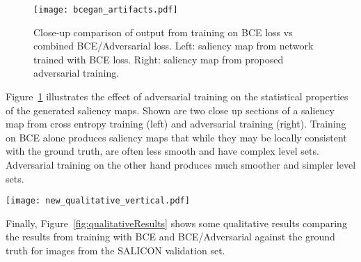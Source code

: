 \documentclass[times,twocolumn,final,authoryear]{elsarticle}
\begin{document}
\begin{figure}
\centering
\texttt{[image: bcegan\_artifacts.pdf]}
\caption{Close-up comparison of output from training on BCE loss vs combined BCE/Adversarial loss. Left: saliency map from network trained with BCE loss. Right: saliency map from proposed adversarial training.}
\label{fig:bcsgan_artifacts}
\end{figure}

\par Figure~\ref{fig:bcsgan_artifacts} illustrates the effect of adversarial training on the statistical properties of the generated saliency maps. Shown are two close up sections of a saliency map from cross entropy training (left) and adversarial training (right). Training on BCE alone produces saliency maps that while they may be locally consistent with the ground truth, are often less smooth and have complex level sets. Adversarial training on the other hand produces much smoother and simpler level sets.
\begin{figure*}
\centering
\texttt{[image: new\_qualitative\_vertical.pdf]}
\caption{Qualitative results of SalGAN on the SALICON validation set. SalGAN predicts well those high salient regions which are missed by BCE model. Saliency maps of BCE model are very localized in a few salient regions, they tend to fail when the number of salient regions increases. }
\label{fig:qualitativeResults}
\end{figure*}
Finally, Figure~\ref{fig:qualitativeResults} shows some qualitative results comparing the results from training with BCE and BCE/Adversarial against the ground truth for images from the SALICON validation set. %



\end{document}

